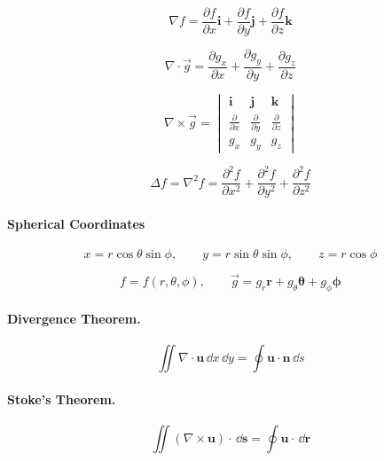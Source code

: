 \[
\nabla f = \frac{\partial f}{\partial x} \mathbf{i} + \frac{\partial f}{\partial y} \mathbf{j} + \frac{\partial f}{\partial z} \mathbf{k}
\]

\[
\nabla \cdot \vec{g} = \frac{\partial g_x}{\partial x} + \frac{\partial g_y}{\partial y}
+ \frac{\partial g_z}{\partial z}
\]

\[
\nabla \times \vec{g} =
\begin{vmatrix}
  \mathbf{i} & \mathbf{j} & \mathbf{k} \\
  \frac{\partial}{\partial x} & \frac{\partial}{\partial y} & \frac{\partial}{\partial z} \\
  g_x & g_y & g_z
\end{vmatrix}
\]

\[
\Delta f = \nabla^2 f = \frac{\partial^2 f}{\partial x^2} + \frac{\partial^2 f}{\partial y^2} + \frac{\partial^2 f}{\partial z^2}
\]


\paragraph{Spherical Coordinates}

\[
x = r \cos \theta \sin \phi, \qquad
y = r \sin \theta \sin \phi, \qquad
z = r \cos \phi
\]

\[
f = f(r, \theta, \phi), \qquad \vec{g} = 
g_r \mathbf{r} + g_\theta \boldsymbol{\theta} + g_\phi \boldsymbol{\phi}
\]








\paragraph{Divergence Theorem.}
\[
\iint \nabla \cdot \mathbf{u} \,\dd x \,\dd y 
= \oint \mathbf{u} \cdot \mathbf{n} \,\dd s
\]

\paragraph{Stoke's Theorem.}
\[
\iint (\nabla \times \mathbf{u}) \cdot \,\dd \mathbf{s}
= \oint \mathbf{u} \cdot \,\dd \mathbf{r}
\]









